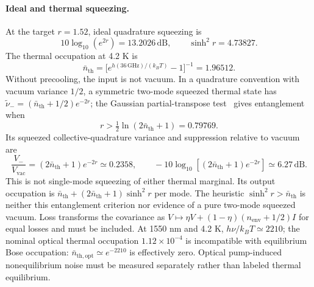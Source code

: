 \documentclass[11pt,a4paper]{article}
\newcommand{\unit}[1]{\,\mathrm{#1}}
\begin{document}
\paragraph{Ideal and thermal squeezing.}
At the target $r=1.52$, ideal quadrature squeezing is
\[
 10\log_{10}(e^{2r})=13.2026\unit{dB},\qquad \sinh^2r=4.73827.
\]
The thermal occupation at 4.2 K is
\[
 \bar n_{\mathrm{th}}=\bigl[e^{h(36\,\mathrm{GHz})/(k_BT)}-1\bigr]^{-1}=1.96512.
\]
Without precooling, the input is not vacuum. In a quadrature convention with vacuum variance
$1/2$, a symmetric two-mode squeezed thermal state has
$\widetilde\nu_-=(\bar n_{\mathrm{th}}+1/2)e^{-2r}$; the Gaussian partial-transpose test~\cite{simon} gives
entanglement when
\[
 r>\tfrac12\ln(2\bar n_{\mathrm{th}}+1)=0.79769.
\]
Its squeezed collective-quadrature variance and suppression relative to vacuum are
\[
 \frac{V_-}{V_{\mathrm{vac}}}=(2\bar n_{\mathrm{th}}+1)e^{-2r}\simeq0.2358,
 \qquad -10\log_{10}\!\left[(2\bar n_{\mathrm{th}}+1)e^{-2r}\right]
 \simeq6.27\unit{dB}.
\]
This is not single-mode squeezing of either thermal marginal. Its output
occupation is $\bar n_{\mathrm{th}}+(2\bar n_{\mathrm{th}}+1)\sinh^2r$ per mode.
The heuristic $\sinh^2r>\bar n_{\mathrm{th}}$ is neither this entanglement criterion nor
evidence of a pure two-mode squeezed vacuum. Loss transforms the covariance as
$V\mapsto\eta V+(1-\eta)(n_{\mathrm{env}}+1/2)I$ for equal losses and must be included.
At 1550 nm and 4.2 K, $h\nu/k_BT\simeq2210$; the nominal optical thermal occupation
$1.12\times10^{-4}$ is incompatible with equilibrium Bose occupation:
$\bar n_{\mathrm{th,opt}}\simeq e^{-2210}$ is effectively zero. Optical pump-induced
nonequilibrium noise must be measured separately rather than labeled thermal equilibrium.
\end{document}
